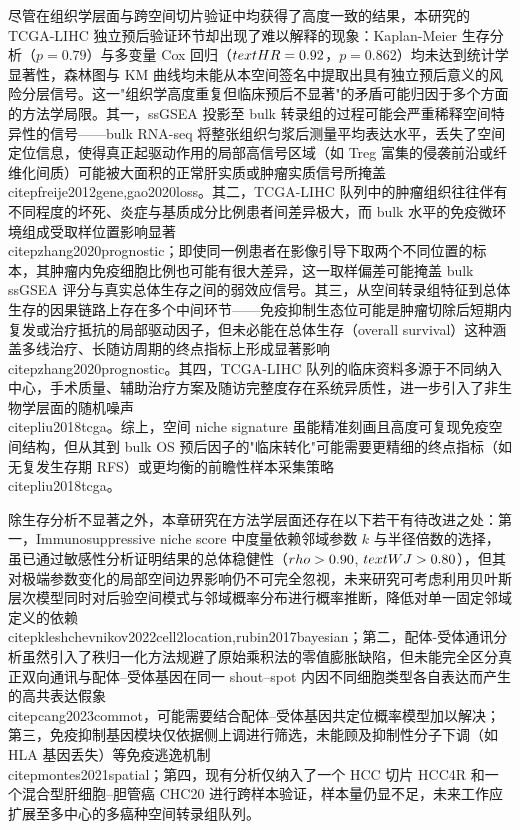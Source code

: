 \documentclass[12pt, a4paper]{ctexart}
\begin{document}
尽管在组织学层面与跨空间切片验证中均获得了高度一致的结果，本研究的 TCGA-LIHC 独立预后验证环节却出现了难以解释的现象：Kaplan-Meier 生存分析（$p = 0.79$）与多变量 Cox 回归（$\\text{HR} = 0.92$，$p = 0.862$）均未达到统计学显著性，森林图与 KM 曲线均未能从本空间签名中提取出具有独立预后意义的风险分层信号。这一"组织学高度重复但临床预后不显著"的矛盾可能归因于多个方面的方法学局限。其一，ssGSEA 投影至 bulk 转录组的过程可能会严重稀释空间特异性的信号——bulk RNA-seq 将整张组织匀浆后测量平均表达水平，丢失了空间定位信息，使得真正起驱动作用的局部高信号区域（如 Treg 富集的侵袭前沿或纤维化间质）可能被大面积的正常肝实质或肿瘤实质信号所掩盖~\\citep{freije2012gene,gao2020loss}。其二，TCGA-LIHC 队列中的肿瘤组织往往伴有不同程度的坏死、炎症与基质成分比例患者间差异极大，而 bulk 水平的免疫微环境组成受取样位置影响显著~\\citep{zhang2020prognostic}；即使同一例患者在影像引导下取两个不同位置的标本，其肿瘤内免疫细胞比例也可能有很大差异，这一取样偏差可能掩盖 bulk ssGSEA 评分与真实总体生存之间的弱效应信号。其三，从空间转录组特征到总体生存的因果链路上存在多个中间环节——免疫抑制生态位可能是肿瘤切除后短期内复发或治疗抵抗的局部驱动因子，但未必能在总体生存（overall survival）这种涵盖多线治疗、长随访周期的终点指标上形成显著影响~\\citep{zhang2020prognostic}。其四，TCGA-LIHC 队列的临床资料多源于不同纳入中心，手术质量、辅助治疗方案及随访完整度存在系统异质性，进一步引入了非生物学层面的随机噪声~\\citep{liu2018tcga}。综上，空间 niche signature 虽能精准刻画且高度可复现免疫空间结构，但从其到 bulk OS 预后因子的"临床转化"可能需要更精细的终点指标（如无复发生存期 RFS）或更均衡的前瞻性样本采集策略~\\citep{liu2018tcga}。

除生存分析不显著之外，本章研究在方法学层面还存在以下若干有待改进之处：第一，Immunosuppressive niche score 中度量依赖邻域参数 $k$ 与半径倍数的选择，虽已通过敏感性分析证明结果的总体稳健性（$\\rho > 0.90$, $\\text{WJ} > 0.80$），但其对极端参数变化的局部空间边界影响仍不可完全忽视，未来研究可考虑利用贝叶斯层次模型同时对后验空间模式与邻域概率分布进行概率推断，降低对单一固定邻域定义的依赖~\\citep{kleshchevnikov2022cell2location,rubin2017bayesian}；第二，配体-受体通讯分析虽然引入了秩归一化方法规避了原始乘积法的零值膨胀缺陷，但未能完全区分真正双向通讯与配体--受体基因在同一 shout--spot 内因不同细胞类型各自表达而产生的高共表达假象~\\citep{cang2023commot}，可能需要结合配体--受体基因共定位概率模型加以解决；第三，免疫抑制基因模块仅依据侧上调进行筛选，未能顾及抑制性分子下调（如 HLA 基因丢失）等免疫逃逸机制~\\citep{montes2021spatial}；第四，现有分析仅纳入了一个 HCC 切片 HCC4R 和一个混合型肝细胞--胆管癌 CHC20 进行跨样本验证，样本量仍显不足，未来工作应扩展至多中心的多癌种空间转录组队列。
\end{document}
